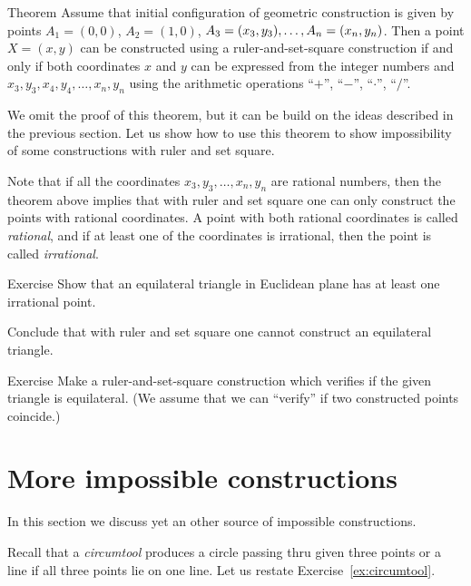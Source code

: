 \begin{thm}{Theorem}
Assume that initial configuration of geometric construction is given by points $A_1=(0,0)$, $A_2=(1,0)$, $A_3=(x_3,y_3),\z\dots,A_n=(x_n,y_n)$.
Then a point $X=(x,y)$ can be constructed using a ruler-and-set-square construction
if and only if both coordinates $x$ and $y$ can be expressed from the integer numbers and $x_3,y_3,x_4,y_4,\dots,x_n,y_n$ using the arithmetic operations ``$+$'', ``$-$'', ``$\cdot$'', ``$/$''. 
\end{thm}

We omit the proof of this theorem, but it can be build on the ideas described in the previous section. 
Let us show how to use this theorem to show impossibility of some constructions with ruler and set square.

Note that if all the coordinates $x_3,y_3,\dots,x_n,y_n$ are rational numbers, then the theorem above implies that with ruler and set square one can only construct the points with rational coordinates.
A point with both rational coordinates is called \emph{rational},
and if at least one of the coordinates is irrational, then the point is called \emph{irrational}.

\begin{thm}{Exercise}\label{ex:equilateral triangle}
Show that an equilateral triangle in Euclidean plane has at least one irrational point.

Conclude that with ruler and set square one cannot construct an equilateral triangle.
\end{thm}


\begin{thm}{Exercise}\label{ex:equilateral triangle-verify}
Make a ruler-and-set-square construction which verifies if the given triangle is  equilateral.
(We assume that we can ``verify'' if two constructed points coincide.) 
\end{thm}


\section*{More impossible constructions}

In this section we discuss yet an other source of impossible constructions. 

Recall that a \emph{circumtool} produces a circle passing thru given three points
or a line if all three points lie on one line.
Let us restate Exercise~\ref{ex:circumtool}.

